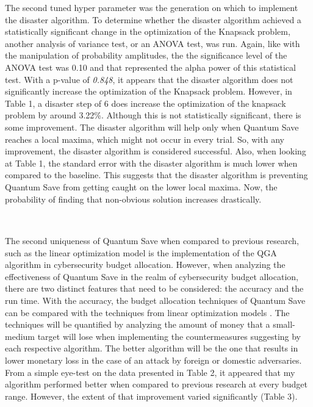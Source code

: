 The second tuned hyper parameter was the generation on which to implement the disaster algorithm. To determine whether the disaster algorithm achieved a statistically significant change in the optimization of the Knapsack problem, another analysis of variance test, or an ANOVA test, was run. Again, like with the manipulation of probability amplitudes, the the significance level of the ANOVA test was 0.10 and that represented the alpha power of this statistical test. With a p-value of \textit{0.848}, it appears that the disaster algorithm does not significantly increase the optimization of the Knapsack problem. However, in Table 1, a disaster step of 6 does increase the optimization of the knapsack problem by around 3.22\%. Although this is not statistically significant, there is some improvement. The disaster algorithm will help only when Quantum Save reaches a local maxima, which might not occur in every  trial. So, with any improvement, the disaster algorithm is considered successful. Also, when looking at Table 1, the standard error with the disaster algorithm is much lower when compared to the baseline. This suggests that the disaster algorithm is preventing Quantum Save from getting caught on the lower local maxima. Now, the probability of finding that non-obvious solution increases drastically. 

\subsection*{\color{SubSectionBlue}{Accuracy of Quantum Save}}
 \\

The second uniqueness of Quantum Save when compared to previous research, such as the linear optimization model \cite{rakes_it_2012} is the implementation of the QGA algorithm in cybersecurity budget allocation. However, when analyzing the effectiveness of Quantum Save in the realm of cybersecurity budget allocation, there are two distinct features that need to be considered: the accuracy and the run time. With the accuracy, the budget allocation techniques of Quantum Save can be compared with the techniques from linear optimization models \cite{rakes_it_2012}. The techniques will be quantified by analyzing the amount of money that a small-medium target will lose when implementing the countermeasures suggesting by each respective algorithm. The better algorithm will be the one that results in lower monetary loss in the case of an attack by foreign or domestic adversaries. From a simple eye-test on the data presented in Table 2, it appeared that my algorithm performed better when compared to previous research \cite{rakes_it_2012} at every budget range. However, the extent of that improvement varied significantly (Table 3).

